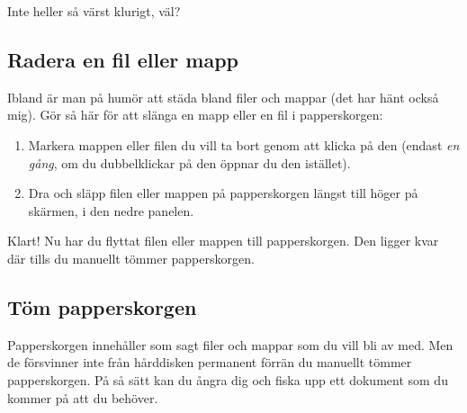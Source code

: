 \documentclass[a4paper,final]{memoir} %
\begin{document}
Inte heller så värst klurigt, väl?



\subsection{Radera en fil eller mapp}


Ibland är man på humör att städa bland filer och mappar (det har hänt också mig). Gör så här för att slänga en mapp eller en fil i papperskorgen:

\begin{enumerate}

\item Markera mappen eller filen du vill ta bort genom att klicka på den (endast \textit{en gång}, om du dubbelklickar på den öppnar du den istället).
\item Dra och släpp filen eller mappen på papperskorgen längst till höger på skärmen, i den nedre panelen. 

\end{enumerate}

Klart! Nu har du flyttat filen eller mappen till papperskorgen. Den ligger kvar där tills du manuellt tömmer papperskorgen.


\subsection{Töm papperskorgen}

Papperskorgen innehåller som sagt filer och mappar som du vill bli av med. Men de försvinner inte från hårddisken permanent förrän du manuellt tömmer papperskorgen. På så sätt kan du ångra dig och fiska upp ett dokument som du kommer på att du behöver.
\end{document}
